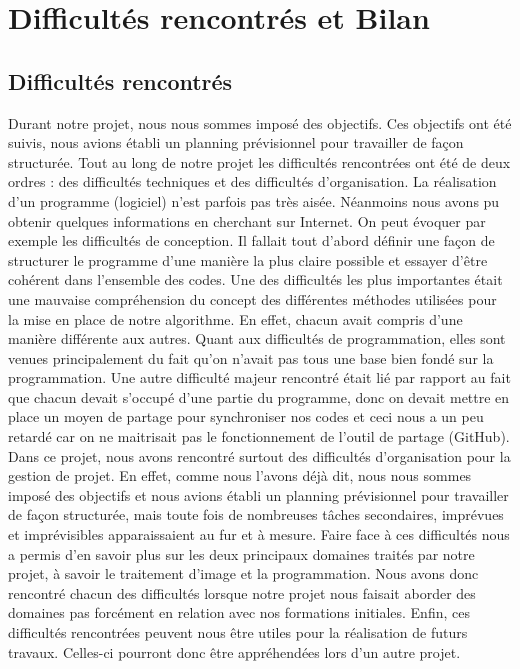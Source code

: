 \documentclass[12pt,a4paper]{article}
\begin{document}
\section{Difficultés rencontrés et Bilan}
\subsection{Difficultés rencontrés}

Durant notre projet, nous nous sommes imposé des objectifs. Ces objectifs ont été suivis, nous avions établi un planning prévisionnel pour travailler de façon structurée. Tout au long de notre projet les difficultés rencontrées ont été de deux ordres : des difficultés techniques et des difficultés d'organisation. 
La réalisation d'un programme (logiciel) n'est parfois pas très aisée. Néanmoins nous avons pu obtenir quelques informations en cherchant sur Internet. 
On peut évoquer par exemple les difficultés de conception. Il fallait  tout d’abord définir une façon de structurer le programme d’une manière  la plus claire possible et essayer d'être cohérent dans l'ensemble des codes.
Une des difficultés les plus importantes était une mauvaise compréhension du concept des différentes méthodes utilisées pour la mise en place de notre algorithme. En effet, chacun avait compris d’une manière différente aux autres.
Quant aux difficultés de programmation, elles sont venues principalement du fait qu’on n’avait pas tous une base bien fondé sur la programmation.
Une autre difficulté majeur rencontré était lié par rapport au fait que chacun devait s’occupé d’une partie du programme, donc on devait mettre en place un moyen de partage pour synchroniser nos codes et ceci nous a un peu retardé car on ne maitrisait pas le fonctionnement de l’outil de partage (GitHub).
Dans ce projet, nous avons rencontré surtout des difficultés d'organisation pour la gestion de projet. En effet, comme nous l’avons déjà dit, nous nous sommes imposé des objectifs et nous avions établi un planning prévisionnel pour travailler de façon structurée, mais toute fois de nombreuses tâches secondaires, imprévues et imprévisibles apparaissaient au fur et à mesure.
Faire face à ces difficultés nous a permis d'en savoir plus sur les deux principaux domaines traités par notre projet, à savoir le traitement d’image et la programmation. Nous avons donc rencontré chacun des difficultés lorsque notre projet nous faisait aborder des domaines pas forcément en relation avec nos formations initiales. 
Enfin, ces difficultés rencontrées peuvent nous être utiles pour la réalisation de futurs travaux. Celles-ci pourront donc être appréhendées lors d'un autre projet.
\end{document}
